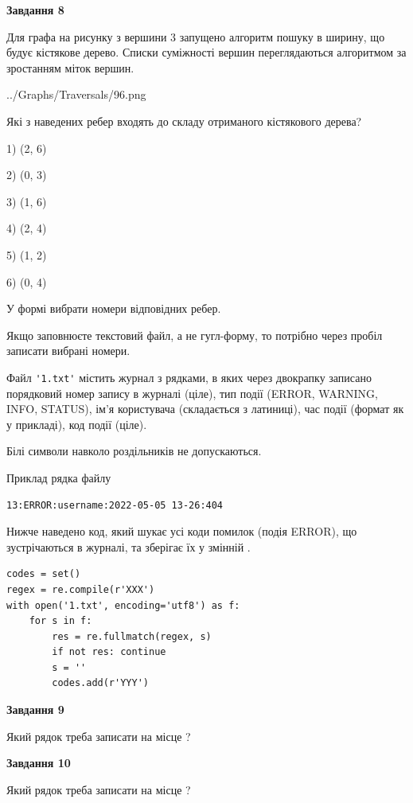 \documentclass[12pt, ukrainian]{article}
\def\code#1{\Verb!#1!}
\begin{document}
{\begin {large}
{\begin {center}\textbf{Завдання 8}\end {center}}\par
Для графа на рисунку з вершини 3 запущено алгоритм пошуку в ширину, що будує кістякове дерево. Списки суміжності вершин переглядаються алгоритмом за зростанням міток вершин.\par
\begin{center}
	{../Graphs/Traversals/96.png}
\end{center}
\par Які з наведених ребер входять до складу отриманого кістякового дерева?\par
1) (2, 6)\par
2) (0, 3)\par
3) (1, 6)\par
4) (2, 4)\par
5) (1, 2)\par
6) (0, 4)\par
{\vskip 15pt} У формі вибрати номери відповідних ребер.


Якщо заповнюєте текстовий файл, а не гугл-форму, то потрібно через пробіл записа\-ти вибрані номери.\par
\newpage


Файл \code{'1.txt'} містить журнал з рядками, в яких через двокрапку записано поряд\-ко\-вий номер запису в журналі (ціле), тип події (ERROR, WARNING, INFO, STATUS), ім'я користувача (складається з латиниці), час події (фор\-мат як у прикладі), код події (ціле).

Білі символи навколо роздільників не допускаються.

Приклад рядка файлу



\begin{verbatim}
13:ERROR:username:2022-05-05 13-26:404
\end{verbatim}


Нижче наведено код, який шукає усі коди помилок (подія ERROR), що зустріча\-ють\-ся в журналі, та зберігає їх у змінній .



\begin{verbatim}
codes = set()
regex = re.compile(r'XXX')
with open('1.txt', encoding='utf8') as f:
    for s in f:
        res = re.fullmatch(regex, s)
        if not res: continue
        s = ''
        codes.add(r'YYY')
\end{verbatim}


{\begin {center}\textbf{Завдання 9}\end {center}}\par
Який рядок треба записати на місце  ?\par
\vspace{5mm}


{\begin {center}\textbf{Завдання 10}\end {center}}\par
Який рядок треба записати на місце  ?\par


\newpage


\end {large}}
\end{document}

